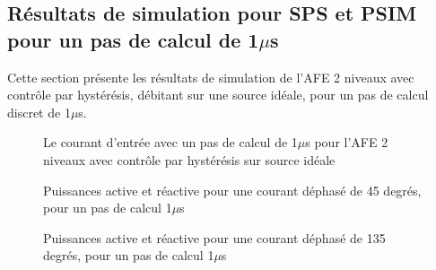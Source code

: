 \subsection{Résultats de simulation pour SPS et PSIM pour un pas de calcul de 1$\mu$s}
Cette section présente les résultats de simulation de l'AFE 2 niveaux avec contrôle par hystérésis, débitant sur une source idéale, pour un pas de calcul discret de 1$\mu$s. 


\begin{figure}[htb]
\caption{Le courant d'entrée avec un pas de calcul de 1$\mu$s pour l'AFE 2 niveaux avec contrôle par hystérésis sur source idéale}
\label{AF_I_cou}
\end{figure}



\begin{figure}[htb]
\caption{Puissances active et réactive pour une courant déphasé de 45 degrés, pour un pas de calcul 1$\mu$s}
\label{AF_I_pui_45}
\end{figure}

\begin{figure}[htb]
\caption{Puissances active et réactive pour une courant déphasé de 135 degrés, pour un pas de calcul 1$\mu$s}
\label{AF_I_pui_135}
\end{figure}


